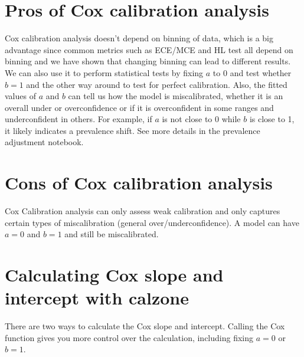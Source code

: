 \documentclass[letterpaper,10pt,english]{sphinxmanual}
\begin{document}
\section{Pros of Cox calibration analysis}
\label{\detokenize{notebooks/cox:Pros-of-Cox-calibration-analysis}}
\sphinxAtStartPar
Cox calibration analysis doesn’t depend on binning of data, which is a big advantage since common metrics such as ECE/MCE and HL test all depend on binning and we have shown that changing binning can lead to different results. We can also use it to perform statistical tests by fixing \(a\) to 0 and test whether \(b=1\) and the other way around to test for perfect calibration. Also, the fitted values of \(a\) and \(b\) can tell us how the model is miscalibrated, whether it is an
overall under\sphinxhyphen{} or over\sphinxhyphen{}confidence or if it is over\sphinxhyphen{}confident in some ranges and under\sphinxhyphen{}confident in others. For example, if \(a\) is not close to 0 while \(b\) is close to 1, it likely indicates a prevalence shift. See more details in the prevalence adjustment notebook.


\section{Cons of Cox calibration analysis}
\label{\detokenize{notebooks/cox:Cons-of-Cox-calibration-analysis}}
\sphinxAtStartPar
Cox Calibration analysis can only assess weak calibration and only captures certain types of miscalibration (general over/under\sphinxhyphen{}confidence). A model can have \(a=0\) and \(b=1\) and still be miscalibrated.


\section{Calculating Cox slope and intercept with calzone}
\label{\detokenize{notebooks/cox:Calculating-Cox-slope-and-intercept-with-calzone}}
\sphinxAtStartPar
There are two ways to calculate the Cox slope and intercept. Calling the Cox function gives you more control over the calculation, including fixing \(a=0\) or \(b=1\).
\end{document}
